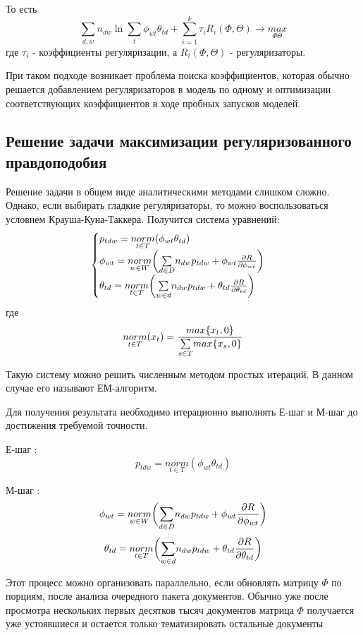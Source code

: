 То есть
$$
\sum_{d,w}{n_{dw} \ln{\sum_t\phi_{wt} \theta_{td}}} + \sum_{i=1}^k \tau_i R_i(\Phi,\Theta) \rightarrow \underset{\Phi\Theta}{max}
$$
где $\tau_i$ - коэффициенты регуляризации, а $R_i(\Phi,\Theta)$ - регуляризаторы.

При таком подходе возникает проблема поиска коэффициентов, которая обычно решается добавлением регуляризаторов в модель по одному и оптимизации соответствующих коэффициентов в ходе пробных запусков моделей.

\subsection{Решение задачи максимизации регуляризованного правдоподобия}
Решение задачи в общем виде аналитическими методами слишком сложно. Однако, если выбирать гладкие регуляризаторы, то можно воспользоваться условием Крауша-Куна-Таккера. Получится система уравнений:
$$
\begin{cases}
    p_{tdw} = \underset{t \in T}{norm}(\phi_{wt} \theta_{td}) \\
    \phi_{wt} = \underset{w \in W}{norm}\bigg( \underset{d \in D}\sum{n_{dw} p_{tdw} + \phi_{wt} {{\partial R} \over {\partial \phi_{wt}}}} \bigg) \\
    \theta_{td} = \underset{t \in T}{norm}\bigg( \underset{w \in d}\sum{n_{dw} p_{tdw} + \theta_{td} {{\partial R} \over {\partial \theta_{td}}}} \bigg) \\
\end{cases}
$$
где
$$
\underset{t \in T}{norm}(x_t) = {{max\{ x_t, 0 \}} \over {\underset{s \in T}\sum{ max\{ x_s, 0 \}} }}
$$

Такую систему можно решить численным методом простых итераций. В данном случае его называют  ЕМ-алгоритм.

Для получения результата необходимо итерационно выполнять Е-шаг и М-шаг до достижения требуемой точности.

Е-шаг :
$$
p_{tdw}=\underset{t \in T}{norm}(\phi_{wt} \theta_{td})
$$

М-шаг : 
$$
\phi_{wt} = \underset{w \in W}{norm}\bigg( \underset{d \in D}\sum{n_{dw} p_{tdw} + \phi_{wt} {{\partial R} \over {\partial \phi_{wt}}}} \bigg)
$$
$$
\theta_{td} = \underset{t \in T}{norm}\bigg( \underset{w \in d}\sum{n_{dw} p_{tdw} + \theta_{td} {{\partial R} \over {\partial \theta_{td}}}} \bigg)
$$

Этот процесс можно организовать параллельно, если обновлять матрицу   $\Phi$ по порциям, после анализа очередного пакета документов. Обычно уже после просмотра нескольких первых десятков тысяч документов матрица $\Phi$ получается уже устоявшиеся и остается только тематизировать остальные документы 


